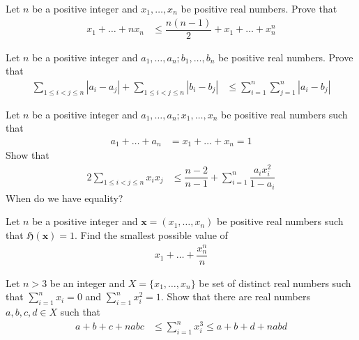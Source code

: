 \documentclass{subfile}
\begin{document}
		\begin{problem}
			Let $n$ be a positive integer and $x_{1},\ldots,x_{n}$ be positive real numbers. Prove that
				\begin{align*}
					x_{1}+\ldots+nx_{n}
						& \leq \dfrac{n(n-1)}{2}+x_{1}+\ldots+x_{n}^{n}
				\end{align*}
		\end{problem}
	
		\begin{problem}
			Let $n$ be a positive integer and $a_{1},\ldots,a_{n};b_{1},\ldots,b_{n}$ be positive real numbers. Prove that
				\begin{align*}
					\sum_{1\leq i<j\leq n}|a_{i}-a_{j}|+\sum_{1\leq i<j\leq n}|b_{i}-b_{j}|
						& \leq \sum_{i=1}^{n}\sum_{j=1}^{n}|a_{i}-b_{j}|
				\end{align*}
		\end{problem}
	
		\begin{problem}
			Let $n$ be a positive integer and $a_{1},\ldots,a_{n};x_{1},\ldots,x_{n}$ be positive real numbers such that
				\begin{align*}
					a_{1}+\ldots+a_{n}
						& = x_{1}+\ldots+x_{n}=1
				\end{align*}
			Show that
				\begin{align*}
					2\sum_{1\leq i<j\leq n}x_{i}x_{j}
						& \leq \dfrac{n-2}{n-1}+\sum_{i=1}^{n}\dfrac{a_{i}x_{i}^{2}}{1-a_{i}}
				\end{align*}
			When do we have equality?
		\end{problem}
	
		\begin{problem}
			Let $n$ be a positive integer and $\mathbf{x}=(x_{1},\ldots,x_{n})$ be positive real numbers such that $\mathfrak{H}(\mathbf{x})=1$. Find the smallest possible value of
				\begin{align*}
					x_{1}+\ldots+\dfrac{x_{n}^{n}}{n}
				\end{align*}
		\end{problem}
	
		\begin{problem}
			Let $n>3$ be an integer and $X=\{x_{1},\ldots,x_{n}\}$ be set of distinct real numbers such that $\sum_{i=1}^{n}x_{i}=0$ and $\sum_{i=1}^{n}x_{i}^{2}=1$. Show that there are real numbers $a,b,c,d\in X$ such that
				\begin{align*}
					a+b+c+nabc
						& \leq \sum_{i=1}^{n}x_{i}^{3}\leq a+b+d+nabd
				\end{align*}
		\end{problem}
\end{document}
